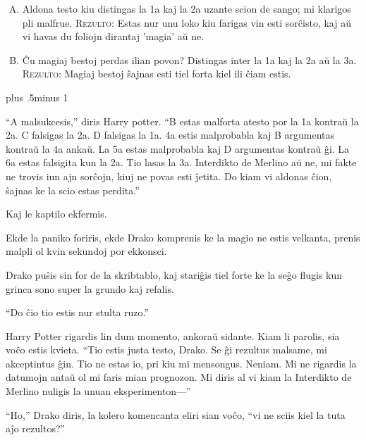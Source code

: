 \begin{centering}
\begin{samepage}
\begin{enumerate}[A.]{
                \firmlist
                \setlength{\leftmargin}{\parindent}
                \setlength{\rightmargin}{1cm}}
        \item Aldona testo kiu distingas la 1a kaj la 2a uzante scion de sango; mi klarigos pli malfrue. {\scshape Rezulto:} Estas nur unu loko kiu farigas vin esti sorĉisto, kaj aŭ vi havas du foliojn dirantaj 'magia' aŭ ne.

        \item Ĉu magiaj bestoj perdas ilian povon? Distingas inter la 1a kaj la 2a aŭ la 3a. {\scshape Rezulto:} Magiaj bestoj ŝajnas esti tiel forta kiel ili ĉiam estis.
        \end{enumerate}
\end{samepage}
\end{centering}
\baselineskip plus .5\textheight minus 1\baselineskip
\restoretrivseps

``A malsukcesis,'' diris Harry potter. ``B estas malforta atesto por
la 1a kontraŭ la 2a. C falsigas la 2a. D falsigas la 1a. 4a estis
malprobabla kaj B argumentas kontraŭ la 4a ankaŭ. La 5a estas
malprobabla kaj D argumentas kontraŭ ĝi. La 6a estas falsigita kun la
2a. Tio lasas la 3a. Interdikto de Merlino aŭ ne, mi fakte ne trovis
iun ajn sorĉojn, kiuj ne povas esti ĵetita. Do kiam vi aldonas ĉion,
ŝajnas ke la scio estas perdita.''

Kaj le kaptilo ekfermis.

Ekde la paniko foriris, ekde Drako komprenis ke la magio ne estis velkanta, prenis malpli ol kvin sekundoj por ekkonsci.

Drako puŝis sin for de la skribtablo, kaj stariĝis tiel forte ke la seĝo flugis kun grinca sono super la grundo kaj refalis.

``Do ĉio tio estis nur stulta ruzo.''

Harry Potter rigardis lin dum momento, ankoraŭ sidante. Kiam li
parolis, sia voĉo estis kvieta. ``Tio estis justa testo, Drako. Se ĝi
rezultus malsame, mi akceptintus ĝin. Tio ne estas io, pri kiu mi
mensongus. Neniam. Mi ne rigardis la datumojn antaŭ ol mi faris mian
prognozon. Mi diris al vi kiam la Interdikto de Merlino nuligis la
unuan eksperimenton—''

``Ho,'' Drako diris, la kolero komencanta eliri sian voĉo, ``vi ne sciis kiel la tuta aĵo rezultos?''

